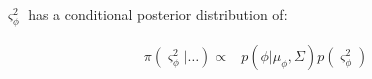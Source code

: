 \documentclass{article}
\begin{document}
%
%
%
%
%
%
%
%
%
%

\subsubsection*{}

$\varsigma^2_\phi$ has a conditional posterior distribution of:

\begin{align*}
\pi(\varsigma^2_\phi | \dots ) \propto & p(\phi | \mu_\phi, \Sigma) p(\varsigma^2_\phi)
\end{align*}
\end{document}
